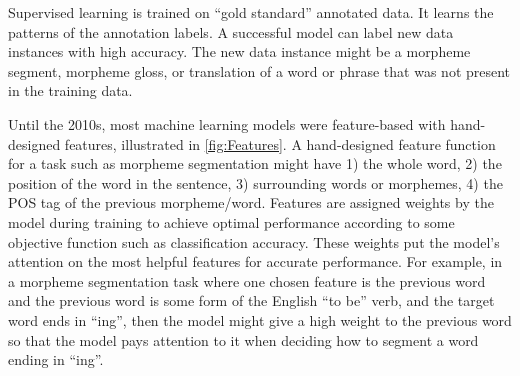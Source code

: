 



Supervised learning is trained on ``gold standard'' annotated data. It learns the patterns of the annotation labels. A successful model can label new data instances with high accuracy. The new data instance might be a morpheme segment, morpheme gloss, or translation of a word or phrase that was not present in the training data. 



Until the 2010s, most machine learning models were feature-based with hand-designed features, illustrated in \autoref{fig:Features}. 
A hand-designed feature function for a task such as morpheme segmentation might have 1) the whole word, 2) the position of the word in the sentence, 3) surrounding words or morphemes, 4) the POS tag of the previous morpheme/word. Features are assigned weights by the model during training to achieve optimal performance according to some objective function such as classification accuracy. These weights put the model's attention on the most helpful features for accurate performance. For example, in a morpheme segmentation task where one chosen feature is the previous word and the previous word is some form of the English ``to be'' verb, and the target word ends in ``ing'', then the model might give a high weight to the previous word so that the model pays attention to it when deciding how to segment a word ending in ``ing''. 


